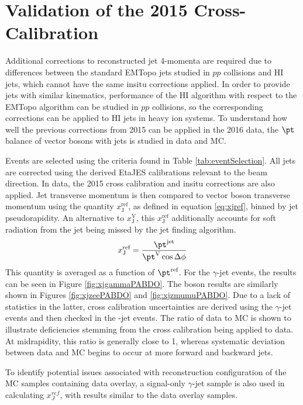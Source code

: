 \documentclass[NOTE, atlasdraft=true, texlive=2016, USenglish]{\ATLASLATEXPATH atlasdoc}
\begin{document}
\section{Validation of the 2015 Cross-Calibration}
\label{sec:EtaJES}

Additional corrections to reconstructed jet 4-momenta are required due to differences between the standard EMTopo jets studied in $pp$ collisions and HI jets, which cannot have the same insitu corrections applied. In order to provide jets with similar kinematics, performance of the HI algorithm with respect to the EMTopo algorithm can be studied in $pp$ collisions, so the corresponding corrections can be applied to HI jets in heavy ion systems. To understand how well the previous corrections from 2015 can be applied in the 2016 data, the $\pt$ balance of vector bosons with jets is studied in data and MC.\par
Events are selected using the criteria found in Table \ref{tab:eventSelection}. All jets are corrected using the derived EtaJES calibrations relevant to the beam direction. In data, the 2015 cross calibration and insitu corrections are also applied. Jet transverse momentum is then compared to vector boson transverse momentum using the quantity $x_{\text{J}}^{\text{ref}}$, as defined in equation \ref{eq:xjref}, binned by jet pseudorapidity. An alternative to $x_{\text{J}}^{\text{V}}$, this $x_{\text{J}}^{\text{ref}}$ additionally accounts for soft radiation from the jet being missed by the jet finding algorithm.
\begin{equation}
	x_{\text{J}}^{\text{ref}} = \frac{\pt^{\text{jet}}}{\pt^{\text{V}} \cos{\Delta\phi}}
	\label{eq:xjref}
\end{equation}
This quantity is averaged as a function of $\pt^{\text{ref}}$. For the $\gamma$-jet events, the results can be seen in Figure \ref{fig:xjgammaPABDO}. The \Zboson boson results are similarly shown in Figures \ref{fig:xjzeePABDO} and \ref{fig:xjzmumuPABDO}. Due to a lack of statistics in the latter, cross calibration uncertainties are derived using the $\gamma$-jet events and then checked in the \Zboson-jet events. The ratio of data to MC is shown to illustrate deficiencies stemming from the cross calibration being applied to data. At midrapidity, this ratio is generally close to 1, whereas systematic deviation between data and MC begins to occur at more forward and backward jets.\par
To identify potential issues associated with reconstruction configuration of the MC samples containing data overlay, a signal-only $\gamma$-jet sample is also used in calculating $x_J^{ref}$, with results similar to the data overlay samples.
\end{document}
